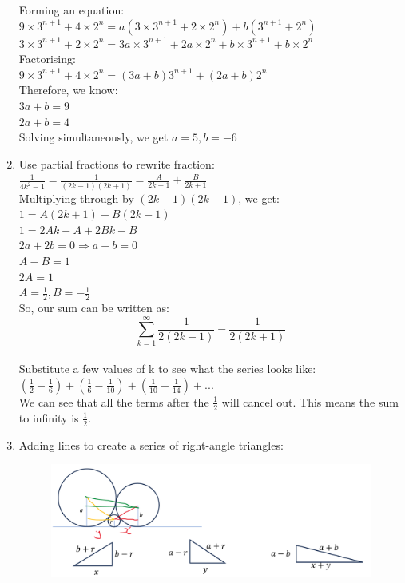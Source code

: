 \documentclass[../main.tex]{subfiles}
\begin{document}
\begin{enumerate}
    Forming an equation:\\
    \(9\times 3^{n+1} + 4 \times 2^n=a(3 \times 3^{n+1} + 2 \times 2^n)+b(3^{n+1}+2^n)\)\\
    \(3 \times 3^{n+1} + 2 \times 2^n=3a \times 3^{n+1}+2a \times 2^n+b\times 3^{n+1}+b\times 2^n\)\\

    Factorising:\\
    \(9\times 3^{n+1} + 4 \times 2^n=(3a+b)3^{n+1}+(2a+b)2^n\)\\

    Therefore, we know:\\
    \(3a+b=9\)\\
    \(2a+b=4\)\\

    Solving simultaneously, we get \(a=5, b=-6\)\\
    
    \item 
    Use partial fractions to rewrite fraction:\\
    \(\frac{1}{4k^2-1}=\frac{1}{(2k-1)(2k+1)}=\frac{A}{2k-1}+\frac{B}{2k+1}\)\\

    Multiplying through by \((2k-1)(2k+1)\), we get:\\
    \(1=A(2k+1)+B(2k-1)\)\\
    \(1=2Ak+A+2Bk-B\)\\
    \(2a+2b=0 \Rightarrow a+b=0\)\\
    \(A-B=1\)\\
    \(2A=1\)\\
    \(A=\frac{1}{2}, B=-\frac{1}{2}\)\\

    So, our sum can be written as:\\
    \[\sum_{k=1}^{\infty} \frac{1}{2(2k-1)}-\frac{1}{2(2k+1)}\]\\
    
    Substitute a few values of k to see what the series looks like:\\
    \((\frac{1}{2}-\frac{1}{6})+(\frac{1}{6}-\frac{1}{10})+(\frac{1}{10}-\frac{1}{14})+...\)\\

    We can see that all the terms after the \(\frac{1}{2}\) will cancel out. This means the sum to infinity is \(\frac{1}{2}\).\\

    \item 
    Adding lines to create a series of right-angle triangles:
    \begin{figure}[H]
        \centering
        \includegraphics[width=0.75\linewidth]{images/t2w1q4_a1.png}
    \end{figure}


\end{enumerate}
\end{document}
